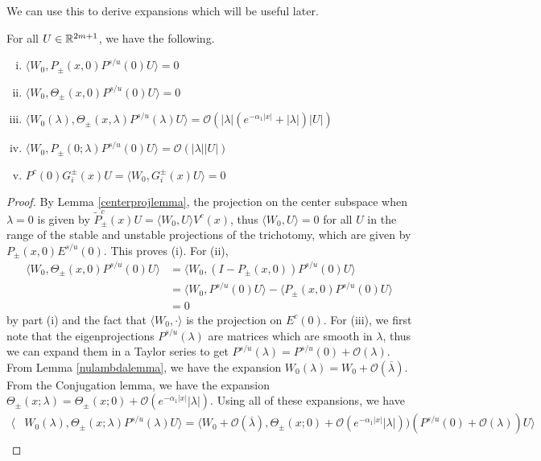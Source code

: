 \documentclass[thesis.tex]{subfiles}
\begin{document}
We can use this to derive expansions which will be useful later.

\begin{lemma}\label{W0projlemma}
For all $U \in \mathbb{R}^{2m+1}$, we have the following.
\begin{enumerate}[(i)]
	\item $\langle W_0, P_\pm(x, 0) P^{s/u}(0) U \rangle = 0$
	\item $\langle W_0, \Theta_\pm(x, 0) P^{s/u}(0) U \rangle = 0$
	\item $\langle W_0(\lambda), \Theta_\pm(x, \lambda) P^{s/u}(\lambda) U \rangle  = \mathcal{O}(|\lambda|( e^{-\alpha_1 |x|} + |\lambda|)|U|)$
	\item $\langle W_0, P_\pm(0; \lambda) P^{s/u}(0) U \rangle = \mathcal{O}(|\lambda||U|)$
	\item $P^c(0) G_i^\pm(x) U = \langle W_0, G_i^\pm(x) U\rangle = 0$
\end{enumerate}
\begin{proof}
By Lemma \ref{centerprojlemma}, the projection on the center subspace when $\lambda = 0$ is given by $\tilde{P}_\pm^c(x)U = \langle W_0, U \rangle V^c(x)$, thus $\langle W_0, U \rangle = 0$ for all $U$ in the range of the stable and unstable projections of the trichotomy, which are given by $P_\pm(x, 0) E^{s/u}(0)$. This proves (i). For (ii), 
\begin{align*}
\langle W_0, \Theta_\pm(x, 0) P^{s/u}(0) U\rangle &=
\langle W_0, (I - P_\pm(x, 0)) P^{s/u}(0) U\rangle \\
&= \langle W_0, P^{s/u}(0) U \rangle - \langle P_\pm(x, 0)P^{s/u}(0) U \rangle \\
&= 0
\end{align*}
by part (i) and the fact that $\langle W_0, \cdot \rangle$ is the projection on $E^c(0)$. For (iii), we first note that the eigenprojections $P^{s/u}(\lambda)$ are matrices which are smooth in $\lambda$, thus we can expand them in a Taylor series to get $P^{s/u}(\lambda) = P^{s/u}(0) + \mathcal{O}(\lambda)$. From Lemma \ref{nulambdalemma}, we have the expansion $W_0(\lambda) = W_0 + \mathcal{O}(\overline{\lambda})$. From the Conjugation lemma, we have the expansion $\Theta_\pm(x; \lambda) = \Theta_\pm(x; 0) + \mathcal{O}(e^{-\alpha_1 |x|}|\lambda|)$. Using all of these expansions, we have
\begin{align*}
\langle &W_0(\lambda), \Theta_\pm(x; \lambda) P^{s/u}(\lambda) U \rangle = \langle W_0 + \mathcal{O}(\overline{\lambda}), \Theta_\pm(x; 0) + \mathcal{O}(e^{-\alpha_1 |x|}|\lambda|))(P^{s/u}(0) + \mathcal{O}(\lambda)) U \rangle \\

\end{align*}
\end{proof}
\end{lemma}
\end{document}
